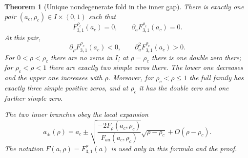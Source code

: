 \documentclass[11pt,letterpaper]{article}
\numberwithin{equation}{section}
\newtheorem{theorem}{Theorem}[section]
\theoremstyle{definition}\newtheorem{definition}[theorem]{Definition}
\theoremstyle{remark}\newtheorem{remark}[theorem]{Remark}
\newcommand{\F}[3]{F_{#1,#2}^{#3}}
\begin{document}
\begin{theorem}[Unique nondegenerate fold in the inner gap]\label{thm:fold}
There is exactly one pair $(a_c,\rho_c)\in I\times(0,1)$ such that
\[
 \F31{\rho_c}(a_c)=0,\qquad \partial_a\F31{\rho_c}(a_c)=0.
\]
At this pair,
\begin{equation}\label{eq:fold-signs}
 \partial_\rho\F31{\rho_c}(a_c)<0,
 \qquad \partial_a^2\F31{\rho_c}(a_c)>0.
\end{equation}
For $0<\rho<\rho_c$ there are no zeros in $I$; at $\rho=\rho_c$ there is one double zero there; for $\rho_c<\rho<1$ there are exactly two simple zeros there. The lower one decreases and the upper one increases with $\rho$. Moreover, for $\rho_c<\rho\le1$ the full family has exactly three simple positive zeros, and at $\rho_c$ it has the double zero and one further simple zero.

The two inner branches obey the local expansion
\begin{equation}\label{eq:fold-sqrt}
 a_\pm(\rho)=a_c\pm
 \sqrt{\frac{-2F_\rho(a_c,\rho_c)}{F_{aa}(a_c,\rho_c)}}
 \sqrt{\rho-\rho_c}+O(\rho-\rho_c).
\end{equation}
The notation $F(a,\rho)=\F31\rho(a)$ is used only in this formula and the proof.
\end{theorem}
\end{document}

